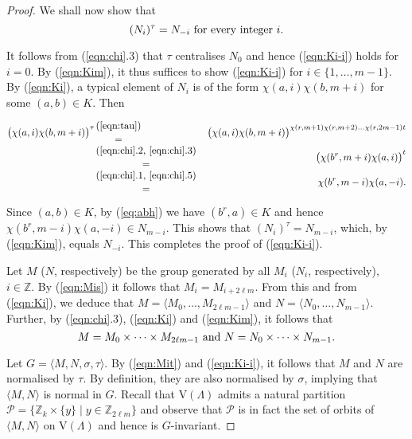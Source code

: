 \documentclass{amsart}
\theoremstyle{definition}
\begin{document}
\begin{proof}
We shall now show that 
\begin{equation}
\label{eqn:Ki-i}
(N_i)^\tau= N_{-i} \hbox{ for every integer } i.
\end{equation}

It follows from (\ref{eqn:chi}.3) that $\tau$ centralises $N_0$ and hence (\ref{eqn:Ki-i}) holds for $i=0$. By (\ref{eqn:Kim}), it thus suffices to show (\ref{eqn:Ki-i}) for  $i\in \{1,\ldots,m-1\}$. By (\ref{eqn:Ki}), a typical element of $N_i$ is of the form $\chi(a,i)\chi(b,m+i)$ for some $(a,b)\in K$. Then

\begin{eqnarray*}
\bigl(\chi(a,i)\chi(b,m+i)\bigr)^\tau
&(\ref{eqn:tau})\atop{=}& \bigl(\chi(a,i)\chi(b,m+i)\bigr)^{\chi(r,m+1)\chi(r,m+2)\ldots \chi(r,2m-1)t}\\
&{(\ref{eqn:chi}.2,\, \ref{eqn:chi}.3)}\atop{=}&
\bigl( \chi(b^r,m+i)\chi(a,i)\bigr)^t\\
&{(\ref{eqn:chi}.1,\, \ref{eqn:chi}.5)}\atop{=}&
\chi(b^r,m-i)\chi(a,-i).
\end{eqnarray*} 

Since $(a,b)\in K$,  by (\ref{eq:abh}) we have $(b^r,a)\in K$ and hence $\chi(b^r,m-i)\chi(a,{-i})\in N_{m-i}$.  This shows that $(N_i)^\tau=N_{m-i}$, which, by (\ref{eqn:Kim}), equals $N_{-i}$. This completes the proof of (\ref{eqn:Ki-i}).

Let $M$ ($N$, respectively) be the group generated by all $M_i$ ($N_i$, respectively), $i\in {\mathbb Z}$. By (\ref{eqn:Mis}) it follows that $M_i = M_{i+2\ell m}$. From this and from (\ref{eqn:Ki}), we deduce that $M = \langle M_0, \ldots, M_{2\ell m-1} \rangle$ and $N=\langle N_0,\ldots,N_{m-1}\rangle$. Further, by (\ref{eqn:chi}.3), (\ref{eqn:Ki}) and (\ref{eqn:Kim}), it follows that
\begin{equation}
\label{eq:N}
M =M_0\times\cdots\times M_{2\ell m-1} \hbox{ and } N=N_0\times\cdots\times N_{m-1}.
\end{equation}

Let $G=\langle M,N,\sigma,\tau\rangle$. By (\ref{eqn:Mit}) and (\ref{eqn:Ki-i}), it follows that  $M$ and $N$ are normalised by $\tau$. By definition, they are also normalised by $\sigma$, implying that $\langle M, N\rangle$ is normal in $G$.  Recall that ${\mathrm V}(\Lambda)$ admits a natural partition ${\mathcal P}=\{{\mathbb Z}_k\times\{y\}\mid y\in{\mathbb Z}_{2\ell m}\}$ and observe that ${\mathcal P}$ is in fact the set of orbits of $\langle M,N\rangle$ on ${\mathrm V}(\Lambda)$ and hence is $G$-invariant.


\end{proof}
\end{document}
